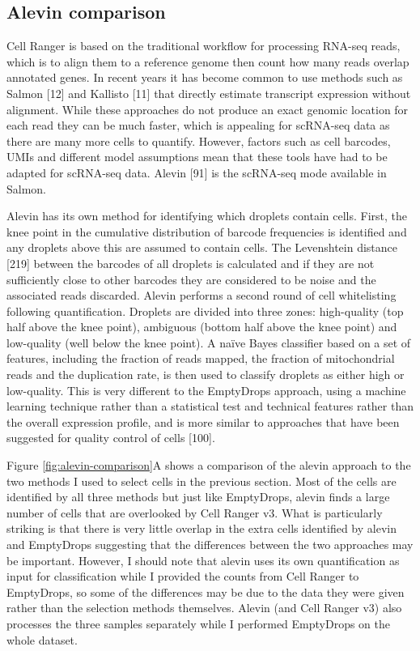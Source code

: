 \documentclass[11pt,a4paper,titlepage,twoside,openright]{style/unimelbthesis}
\theoremstyle{definition}
\theoremstyle{definition}
\theoremstyle{definition}
\theoremstyle{remark}
\begin{document}
\begin{mainmatter}
{\subsection{Alevin comparison}\label{alevin-comparison}}

Cell Ranger is based on the traditional workflow for processing RNA-seq reads, which is to align them to a reference genome then count how many reads overlap annotated genes. In recent years it has become common to use methods such as Salmon {[}12{]} and Kallisto {[}11{]} that directly estimate transcript expression without alignment. While these approaches do not produce an exact genomic location for each read they can be much faster, which is appealing for scRNA-seq data as there are many more cells to quantify. However, factors such as cell barcodes, UMIs and different model assumptions mean that these tools have had to be adapted for scRNA-seq data. Alevin {[}91{]} is the scRNA-seq mode available in Salmon.

Alevin has its own method for identifying which droplets contain cells. First, the knee point in the cumulative distribution of barcode frequencies is identified and any droplets above this are assumed to contain cells. The Levenshtein distance {[}219{]} between the barcodes of all droplets is calculated and if they are not sufficiently close to other barcodes they are considered to be noise and the associated reads discarded. Alevin performs a second round of cell whitelisting following quantification. Droplets are divided into three zones: high-quality (top half above the knee point), ambiguous (bottom half above the knee point) and low-quality (well below the knee point). A naïve Bayes classifier based on a set of features, including the fraction of reads mapped, the fraction of mitochondrial reads and the duplication rate, is then used to classify droplets as either high or low-quality. This is very different to the EmptyDrops approach, using a machine learning technique rather than a statistical test and technical features rather than the overall expression profile, and is more similar to approaches that have been suggested for quality control of cells {[}100{]}.

Figure \ref{fig:alevin-comparison}A shows a comparison of the alevin approach to the two methods I used to select cells in the previous section. Most of the cells are identified by all three methods but just like EmptyDrops, alevin finds a large number of cells that are overlooked by Cell Ranger v3. What is particularly striking is that there is very little overlap in the extra cells identified by alevin and EmptyDrops suggesting that the differences between the two approaches may be important. However, I should note that alevin uses its own quantification as input for classification while I provided the counts from Cell Ranger to EmptyDrops, so some of the differences may be due to the data they were given rather than the selection methods themselves. Alevin (and Cell Ranger v3) also processes the three samples separately while I performed EmptyDrops on the whole dataset.


\end{mainmatter}
\end{document}

